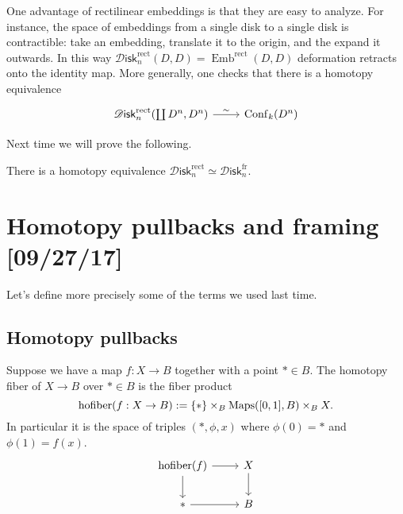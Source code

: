 \documentclass{amsart}
\DeclareMathOperator{\Emb}{Emb}
\DeclareMathOperator{\Conf}{Conf}
\DeclareMathOperator{\hofiber}{hofiber}
\newcommand{\Diskf}{\mathscr{D}\mathsf{isk}_n^\text{fr}}
\newcommand{\Diskr}{\mathscr{D}\mathsf{isk}_n^\text{rect}}
\begin{document}
One advantage of rectilinear embeddings is that they are easy to analyze.
For instance, the space of embeddings from a single disk to a single disk is contractible:
take an embedding, translate it to the origin, and the expand it outwards. In this
way $\Diskr(D,D)=\Emb^\text{rect}(D,D)$ deformation retracts onto the identity map.
More generally, one checks that there is a homotopy equivalence
\begin{equation*}
    \begin{tikzcd}
        \Diskr(\coprod D^n, D^n) \rar{\sim} & \Conf_k(D^n)
    \end{tikzcd}
\end{equation*}

Next time we will prove the following.
\begin{proposition}
    There is a homotopy equivalence $\Diskr \simeq \Diskf$.
\end{proposition}


\newpage
\section{Homotopy pullbacks and framing [09/27/17]}

Let's define more precisely some of the terms we used last time.

\subsection{Homotopy pullbacks}

\begin{definition}
    Suppose we have a map $f:X\to B$ together with a point $*\in B$. The homotopy fiber
    of $X\to B$ over $*\in B$ is the fiber product
    \begin{equation*}
        \hofiber(f:X\to B) := \{*\}\times_B\Maps([0,1], B)\times_B X.
    \end{equation*}
    In particular it is the space of triples $(*, \phi, x)$ where $\phi(0)=*$
    and $\phi(1)=f(x)$.
    \begin{equation*}
        \begin{tikzcd}
            \hofiber(f) \rar \dar & X\dar \\
            * \rar & B
        \end{tikzcd}
    \end{equation*}
\end{definition}
\end{document}

